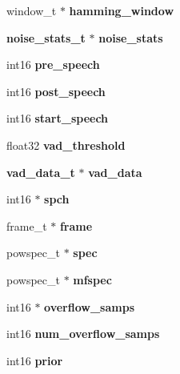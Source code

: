 \begin{DoxyCompactItemize}
\item 
window\+\_\+t $\ast$ {\bfseries hamming\+\_\+window}\label{structfe__s_ad47433337a370e452070ffddce87e474}

\item 
{\bf noise\+\_\+stats\+\_\+t} $\ast$ {\bfseries noise\+\_\+stats}\label{structfe__s_a6b1303b8c74a676ca9dcc9adc07033e9}

\item 
int16 {\bfseries pre\+\_\+speech}\label{structfe__s_a2bcaff6bbc8ee6e990a7092bd0d22771}

\item 
int16 {\bfseries post\+\_\+speech}\label{structfe__s_a46c8eab758b1a737ccc5ef4654e42f6c}

\item 
int16 {\bfseries start\+\_\+speech}\label{structfe__s_a93290323d05eb26e0dfe423a9b27063a}

\item 
float32 {\bfseries vad\+\_\+threshold}\label{structfe__s_a8c484564cca88e8aec167fe94bd27891}

\item 
{\bf vad\+\_\+data\+\_\+t} $\ast$ {\bfseries vad\+\_\+data}\label{structfe__s_aaae66e5327a74c4270c8f0decd4d4389}

\item 
int16 $\ast$ {\bfseries spch}\label{structfe__s_a7d49693c1fa1b14bbcd25b87ad97935b}

\item 
frame\+\_\+t $\ast$ {\bfseries frame}\label{structfe__s_a6fe89784eb5d23ee812439f427d33fe6}

\item 
powspec\+\_\+t $\ast$ {\bfseries spec}\label{structfe__s_af455b0ee3f8d81ca84ac88d4ea04e860}

\item 
powspec\+\_\+t $\ast$ {\bfseries mfspec}\label{structfe__s_a87fd448109884fc3d796b926b67697e7}

\item 
int16 $\ast$ {\bfseries overflow\+\_\+samps}\label{structfe__s_a7975216c6a540fa498352736404797b1}

\item 
int16 {\bfseries num\+\_\+overflow\+\_\+samps}\label{structfe__s_ac22fe7c117ef00eb513d7d0771333ddd}

\item 
int16 {\bfseries prior}\label{structfe__s_ae6af635a19dac6426bf882a3fc5b069b}

\end{DoxyCompactItemize}


